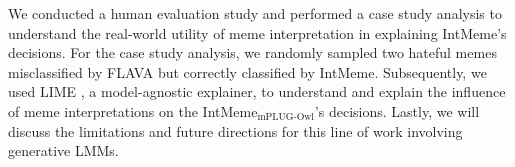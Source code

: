 


We conducted a human evaluation study and performed a case study analysis to understand the real-world utility of meme interpretation in explaining IntMeme's decisions. For the case study analysis, we randomly sampled two hateful memes misclassified by FLAVA but correctly classified by IntMeme. Subsequently, we used LIME \cite{lime}, a model-agnostic explainer, to understand and explain the influence of meme interpretations on the IntMeme$_\text{mPLUG-Owl}$'s decisions. Lastly, we will discuss the limitations and future directions for this line of work involving generative LMMs.





